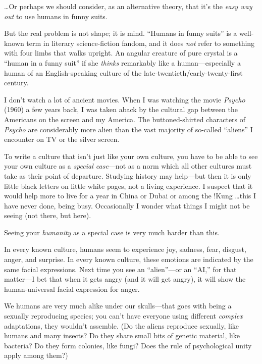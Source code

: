 {
 \ldots Or perhaps we should consider, as an alternative theory,
that it's the \textit{easy way out} to use humans in
funny suits.}

{
 But the real problem is not shape; it is mind.
``Humans in funny suits'' is a
well-known term in literary science-fiction fandom, and it does
\textit{not} refer to something with four limbs that walks upright. An
angular creature of pure crystal is a ``human in a
funny suit'' if she \textit{thinks} remarkably like a
human---especially a human of an English-speaking culture of the
late-twentieth/early-twenty-first century.}

{
 I don't watch a lot of ancient movies. When I was
watching the movie \textit{Psycho} (1960) a few years back, I was taken
aback by the cultural gap between the Americans on the screen and my
America. The buttoned-shirted characters of \textit{Psycho} are
considerably more alien than the vast majority of so-called
``aliens'' I encounter on TV or the
silver screen.}

{
 To write a culture that isn't just like your own
culture, you have to be able to see your own culture as a
\textit{special case}{}---not as a norm which all other cultures must
take as their point of departure. Studying history may help---but then
it is only little black letters on little white pages, not a living
experience. I suspect that it would help more to live for a year in
China or Dubai or among the !Kung \ldots this I have never done, being
busy. Occasionally I wonder what things I might not be seeing (not
there, but here).}

{
 Seeing your \textit{humanity} as a special case is very much
harder than this.}

{
 In every known culture, humans seem to experience joy, sadness,
fear, disgust, anger, and surprise. In every known culture, these
emotions are indicated by the same facial expressions. Next time you
see an ``alien''---or an
``AI,'' for that matter---I bet that
when it gets angry (and it will get angry), it will show the
human-universal facial expression for anger.}

{
 We humans are very much alike under our skulls---that goes with
being a sexually reproducing species; you can't have
everyone using different \textit{complex} adaptations, they
wouldn't assemble. (Do the aliens reproduce sexually,
like humans and many insects? Do they share small bits of genetic
material, like bacteria? Do they form colonies, like fungi? Does the
rule of psychological unity apply among them?)}


